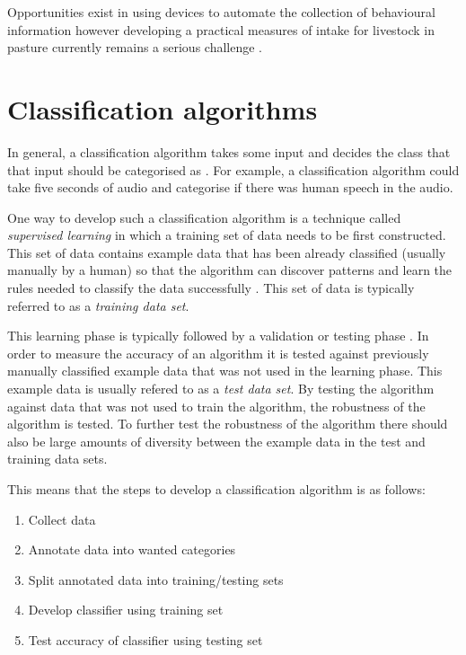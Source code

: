 Opportunities exist in using devices to automate the collection of behavioural information however developing a practical measures of intake for livestock in pasture currently remains a serious challenge \cite{Cottle2013}. 


\section{Classification algorithms}
In general, a classification algorithm takes some input and decides the class that that input should be categorised as \cite{xu2005survey}. For example, a classification algorithm could take five seconds of audio and categorise if there was human speech in the audio. 

One way to develop such a classification algorithm is a technique called \textit{supervised learning} in which a training set of data needs to be first constructed. This set of data contains example data that has been already classified (usually manually by a human) so that the algorithm can discover patterns and learn the rules needed to classify the data successfully \cite{mohri2012foundations}. This set of data is typically referred to as a \textit{training data set}. 

This learning phase is typically followed by a validation or testing phase \cite{mohri2012foundations}. In order to measure the accuracy of an algorithm it is tested against previously manually classified example data that was not used in the learning phase. This example data is usually refered to as a \textit{test data set}. By testing the algorithm against data that was not used to train the algorithm, the robustness of the algorithm is tested. To further test the robustness of the algorithm there should also be large amounts of diversity between the example data in the test and training data sets.

This means that the steps to develop a classification algorithm is as follows:

\begin{enumerate}
\item Collect data

\item Annotate data into wanted categories

\item Split annotated data into training/testing sets

\item Develop classifier using training set

\item Test accuracy of classifier using testing set
\end{enumerate}

